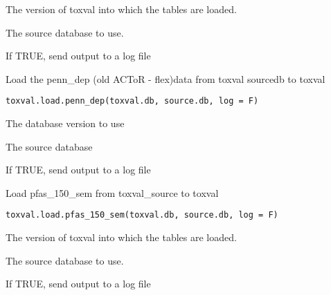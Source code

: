\documentclass[letterpaper]{book}
\begin{document}
%
\begin{Arguments}
\begin{ldescription}
\item[\code{toxval.db}] The version of toxval into which the tables are loaded.

\item[\code{source.db}] The source database to use.

\item[\code{log}] If TRUE, send output to a log file
\end{ldescription}
\end{Arguments}
%
\begin{Description}\relax
Load the penn\_dep (old ACToR - flex)data  from toxval sourcedb to toxval
\end{Description}
%
\begin{Usage}
\begin{verbatim}
toxval.load.penn_dep(toxval.db, source.db, log = F)
\end{verbatim}
\end{Usage}
%
\begin{Arguments}
\begin{ldescription}
\item[\code{toxval.db}] The database version to use

\item[\code{source.db}] The source database

\item[\code{log}] If TRUE, send output to a log file
\end{ldescription}
\end{Arguments}
%
\begin{Description}\relax
Load pfas\_150\_sem from toxval\_source to toxval
\end{Description}
%
\begin{Usage}
\begin{verbatim}
toxval.load.pfas_150_sem(toxval.db, source.db, log = F)
\end{verbatim}
\end{Usage}
%
\begin{Arguments}
\begin{ldescription}
\item[\code{toxval.db}] The version of toxval into which the tables are loaded.

\item[\code{source.db}] The source database to use.

\item[\code{log}] If TRUE, send output to a log file
\end{ldescription}
\end{Arguments}
\end{document}
